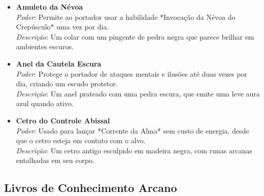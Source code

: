 \begin{itemize}
    \item \textbf{Amuleto da Névoa} \\
    \textit{Poder}: Permite ao portador usar a habilidade *Invocação da Névoa do Crepúsculo* uma vez por dia. \\
    \textit{Descrição}: Um colar com um pingente de pedra negra que parece brilhar em ambientes escuros.
    
    \item \textbf{Anel da Cautela Escura} \\
    \textit{Poder}: Protege o portador de ataques mentais e ilusões até duas vezes por dia, criando um escudo protetor. \\
    \textit{Descrição}: Um anel prateado com uma pedra escura, que emite uma leve aura azul quando ativo.
    
    \item \textbf{Cetro do Controle Abissal} \\
    \textit{Poder}: Usado para lançar *Corrente da Alma* sem custo de energia, desde que o cetro esteja em contato com o alvo. \\
    \textit{Descrição}: Um cetro antigo esculpido em madeira negra, com runas arcanas entalhadas em seu corpo.
\end{itemize}

\subsection{Livros de Conhecimento Arcano}


